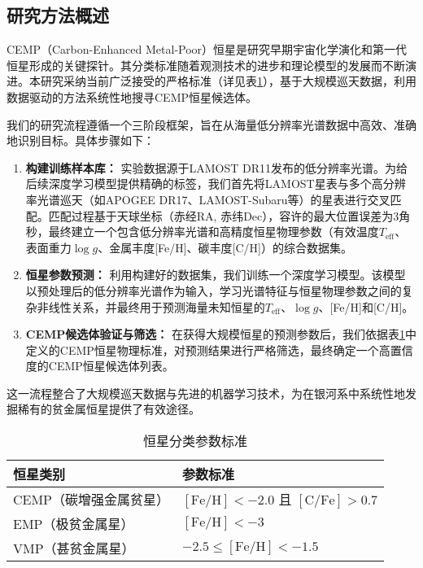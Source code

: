 \subsection{研究方法概述}

CEMP（Carbon-Enhanced Metal-Poor）恒星是研究早期宇宙化学演化和第一代恒星形成的关键探针。其分类标准随着观测技术的进步和理论模型的发展而不断演进\cite{beers1992, aoki2007, norris2013}。本研究采纳当前广泛接受的严格标准（详见表\ref{tab:star_criteria}），基于大规模巡天数据，利用数据驱动的方法系统性地搜寻CEMP恒星候选体。

我们的研究流程遵循一个三阶段框架，旨在从海量低分辨率光谱数据中高效、准确地识别目标。具体步骤如下：
\begin{enumerate}
    \item \textbf{构建训练样本库：} 实验数据源于LAMOST DR11发布的低分辨率光谱。为给后续深度学习模型提供精确的标签，我们首先将LAMOST星表与多个高分辨率光谱巡天（如APOGEE DR17、LAMOST-Subaru等）的星表进行交叉匹配。匹配过程基于天球坐标（赤经RA, 赤纬Dec），容许的最大位置误差为3角秒，最终建立一个包含低分辨率光谱和高精度恒星物理参数（有效温度$T_{\text{eff}}$、表面重力$\log g$、金属丰度[Fe/H]、碳丰度[C/H]）的综合数据集。
    \item \textbf{恒星参数预测：} 利用构建好的数据集，我们训练一个深度学习模型。该模型以预处理后的低分辨率光谱作为输入，学习光谱特征与恒星物理参数之间的复杂非线性关系，并最终用于预测海量未知恒星的$T_{\text{eff}}$、$\log g$、[Fe/H]和[C/H]。
    \item \textbf{CEMP候选体验证与筛选：} 在获得大规模恒星的预测参数后，我们依据表\ref{tab:star_criteria}中定义的CEMP恒星物理标准，对预测结果进行严格筛选，最终确定一个高置信度的CEMP恒星候选体列表。
\end{enumerate}


这一流程整合了大规模巡天数据与先进的机器学习技术，为在银河系中系统性地发掘稀有的贫金属恒星提供了有效途径。


\begin{table}[htbp]
    \centering
    \caption{恒星分类参数标准}
    \label{tab:star_criteria}
    \begin{tabular}{|l|l|}
    \hline
    \textbf{恒星类别} & \textbf{参数标准} \\
    \hline
    CEMP（碳增强金属贫星） & $[\mathrm{Fe}/\mathrm{H}] < -2.0$ 且 $[\mathrm{C}/\mathrm{Fe}] > 0.7$ \\
    \hline
    EMP（极贫金属星） & $[\mathrm{Fe}/\mathrm{H}] < -3$ \\
    \hline
    VMP（甚贫金属星） & $-2.5 \le [\mathrm{Fe}/\mathrm{H}] < -1.5$ \\
    \hline
    \end{tabular}
\end{table}

